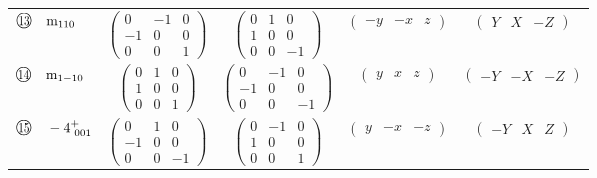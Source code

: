 \documentclass[fleqn,10pt,landscape]{jsarticle}
\begin{document}
\begin{center}
\begin{longtable}{lcccc}
$ {\ooalign{\hfil\resizebox{.8\width}{\height}{13}\hfil\crcr\raise.1ex\hbox{\large$\bigcirc$}}}\quad {\rm m}_{110} $ & $ \begin{pmatrix} 0 & -1 & 0 \\ -1 & 0 & 0 \\ 0 & 0 & 1 \end{pmatrix} $ & $ \begin{pmatrix} 0 & 1 & 0 \\ 1 & 0 & 0 \\ 0 & 0 & -1 \end{pmatrix} $ & $ \begin{pmatrix} - y & - x & z \end{pmatrix} $ & $ \begin{pmatrix} Y & X & - Z \end{pmatrix} $ \\
$ {\ooalign{\hfil\resizebox{.8\width}{\height}{14}\hfil\crcr\raise.1ex\hbox{\large$\bigcirc$}}}\quad {\rm m}_{1-10} $ & $ \begin{pmatrix} 0 & 1 & 0 \\ 1 & 0 & 0 \\ 0 & 0 & 1 \end{pmatrix} $ & $ \begin{pmatrix} 0 & -1 & 0 \\ -1 & 0 & 0 \\ 0 & 0 & -1 \end{pmatrix} $ & $ \begin{pmatrix} y & x & z \end{pmatrix} $ & $ \begin{pmatrix} - Y & - X & - Z \end{pmatrix} $ \\
$ {\ooalign{\hfil\resizebox{.8\width}{\height}{15}\hfil\crcr\raise.1ex\hbox{\large$\bigcirc$}}}\quad -4^{+}_{\,\,001} $ & $ \begin{pmatrix} 0 & 1 & 0 \\ -1 & 0 & 0 \\ 0 & 0 & -1 \end{pmatrix} $ & $ \begin{pmatrix} 0 & -1 & 0 \\ 1 & 0 & 0 \\ 0 & 0 & 1 \end{pmatrix} $ & $ \begin{pmatrix} y & - x & - z \end{pmatrix} $ & $ \begin{pmatrix} - Y & X & Z \end{pmatrix} $ \\

\end{longtable}
\end{center}
\end{document}
